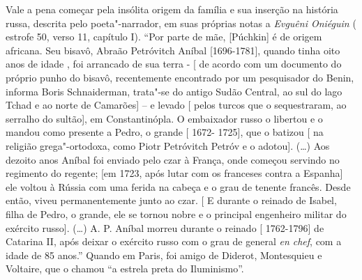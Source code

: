 Vale a pena começar pela insólita origem da família e sua inserção na
história russa, descrita pelo poeta"-narrador, em suas próprias notas a
\emph{Evguêni Oniéguin} ( estrofe 50, verso 11, capítulo I). ``Por parte
de mãe, {[}Púchkin{]} é de origem africana. Seu bisavô, Abraão
Petróvitch Aníbal {[}1696-1781{]}, quando tinha oito anos de idade , foi
arrancado de sua terra - {[} de acordo com um documento do próprio punho
do bisavô, recentemente encontrado por um pesquisador do Benin, informa
Boris Schnaiderman, trata"-se do antigo Sudão Central, ao sul do lago
Tchad e ao norte de Camarões{]} -- e levado {[} pelos turcos que o
sequestraram, ao serralho do sultão{]}, em Constantinópla. O embaixador
russo o libertou e o mandou como presente a Pedro, o grande {[} 1672-
1725{]}, que o batizou {[} na religião grega"-ortodoxa, como Piotr
Petróvitch Petróv e o adotou{]}. (\ldots{}) Aos dezoito anos Aníbal foi
enviado pelo czar à França, onde começou servindo no regimento do
regente; {[}em 1723, após lutar com os franceses contra a Espanha{]} ele
voltou à Rússia com uma ferida na cabeça e o grau de tenente francês.
Desde então, viveu permanentemente junto ao czar. {[} E durante o
reinado de Isabel, filha de Pedro, o grande, ele se tornou nobre e o
principal engenheiro militar do exército russo{]}. (\ldots{}) A. P. Aníbal
morreu durante o reinado {[} 1762-1796{]} de Catarina II, após deixar o
exército russo com o grau de general \emph{en chef}, com a idade de 85
anos.'' Quando em Paris, foi amigo de Diderot, Montesquieu e Voltaire,
que o chamou ``a estrela preta do Iluminismo''.

